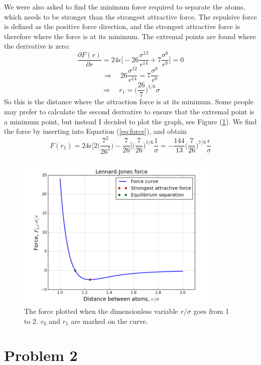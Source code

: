 \documentclass[norsk,a4paper,12pt]{article}
\begin{document}
We were also asked to find the minimum force required to separate the atoms, which needs to be stronger than the strongest attractive force. The repulsive force is defined as the positive force direction, and the strongest attractive force is therefore where the force is at its minimum. The extremal points are found where the derivative is zero:
$$\frac{\partial F(r)}{\partial r}=24\epsilon\bigg[-26\frac{\sigma^{12}}{r^{14}}+7\frac{\sigma^6}{r^8}\bigg]=0$$
$$\Rightarrow \quad26\frac{\sigma^{12}}{r^{14}}=7\frac{\sigma^6}{r^8}$$
\begin{equation}
\Rightarrow \quad r_1=\bigg(\frac{26}{7}\bigg)^{1/6}\sigma
\end{equation}
So this is the distance where the attraction force is at its minimum. Some people may prefer to calculate the second derivative to ensure that the extremal point is a minimum point, but instead I decided to plot the graph, see Figure (\ref{fig:LJforce}). We find the force by inserting into Equation (\ref{eq:force}), and obtain
\begin{equation}
F(r_1)=24\epsilon\Bigg[2\bigg(\frac{7^2}{26^2}\bigg)-\frac{7}{26}\Bigg]\bigg(\frac{7}{26}\bigg)^{1/6}\frac{1}{\sigma}=\underline{-\frac{144}{13}\bigg(\frac{7}{26}\bigg)^{7/6}\frac{\epsilon}{\sigma}}
\end{equation}
\begin{figure}[!htbp]
\centering
\includegraphics[width=100mm]{figure_1.png}
\caption{The force plotted when the dimensionless variable $r/\sigma$ goes from 1 to 2. $r_0$ and $r_1$ are marked on the curve. \label{fig:LJforce}}
\end{figure}

\section*{Problem 2}
\end{document}
